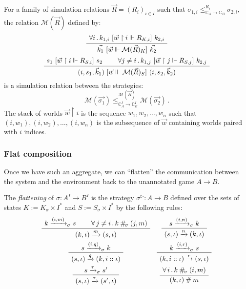 \begin{lemma} %
For a family of simulation relations $\vec{R} = (R_i)_{i \in I}$ such that
$\sigma_{1,i} \le_{\mathbb{C}_A \rightarrow \mathbb{C}_B}^{R_i} \sigma_{2,i}$,
the relation $\mathcal{M}(\vec{R})$ defined by:
\begin{gather*}
  \AxiomC{$\forall i \,.\,
    k_{1,i} \ifr{\vec{w} \restriction i \Vdash R_{K,i}} k_{2,i}$}
  \UnaryInfC{$\vec{k_1} \ifr{\vec{w} \Vdash \mathcal{M}(\vec{R})_K} \vec{k_2}$}
  \DisplayProof
  \\[.5ex]
  \AxiomC{$s_1 \ifr{\vec{w} \restriction i \Vdash R_{S,i}} s_2$}
  \AxiomC{$\forall j \ne i \,.\,
    k_{1,j} \ifr{\vec{w} \restriction j \Vdash R_{S,j}} k_{2,j}$}
  \BinaryInfC{$(i, s_1, \vec{k}_1)
    \ifr{\vec{w} \Vdash \mathcal{M}(\vec{R})_S}
    (i, s_2, \vec{k}_2)$}
  \DisplayProof
\end{gather*}
is a simulation relation between the strategies:
\[
  \mathcal{M}(\vec{\sigma_1})
  \le_{\mathbb{C}_A^I \rightarrow \mathbb{C}_B^I}^{\mathcal{M}(\vec{R})}
  \mathcal{M}(\vec{\sigma_2}) \, .
\]
The stack of worlds $\vec{w} \restriction i$
is the sequence $w_1, w_2, \ldots, w_n$
such that $(i, w_1), (i, w_2), \ldots, (i, w_n)$
is the subsequence of $\vec{w}$ containing worlds
paired with $i$ indices.
\end{lemma}


\subsubsection{Flat composition} %

Once we have such an aggregate,
we can ``flatten'' the communication between
the system and the environment
back to the unannotated game $A \rightarrow B$.

\begin{definition} %
The \emph{flattening} of $\sigma : A^I \rightarrow B^I$
is the strategy $\sigma^\rhd : A \rightarrow B$
defined over the sets of states
$K := K_\sigma \times I^*$ and
$S := S_\sigma \times I^*$ by the following rules:
\[
  \begin{array}{c@{\quad}c}
    \AxiomC{$k \xrightarrow{(i, m)}_\sigma s$}
    \AxiomC{$\forall \, j \ne i \,.\, k \: \#_{\!\sigma} \: (j, m)$}
    \BinaryInfC{$(k, \iota) \xrightarrow{m} (s, \iota)$}
    \DisplayProof
    &
    \AxiomC{$s \xrightarrow{(i, n)}_\sigma k$}
    \UnaryInfC{$(s, \iota) \xrightarrow{n} (k, \iota)$}
    \DisplayProof
    \\[1.5em]
    \AxiomC{$s \xrightarrow{(i, q)}_\sigma k$}
    \UnaryInfC{$(s, \iota) \xrightarrow{q} (k, i :: \iota)$}
    \DisplayProof
    &
    \AxiomC{$k \xrightarrow{(i, r)}_\sigma s$}
    \UnaryInfC{$(k, i :: \iota) \xrightarrow{r} (s, \iota)$}
    \DisplayProof
    \\[1.5em]
    \AxiomC{$s \xrightarrow{\tau}_\sigma s'$}
    \UnaryInfC{$(s, \iota) \xrightarrow{\tau} (s', \iota)$}
    \DisplayProof
    &
    \AxiomC{$\forall \,i\,.\, k \: \#_{\!\sigma} \: (i, m)$}
    \UnaryInfC{$(k, \iota) \:\#\: m$}
    \DisplayProof
  \end{array}
\]
\end{definition}

